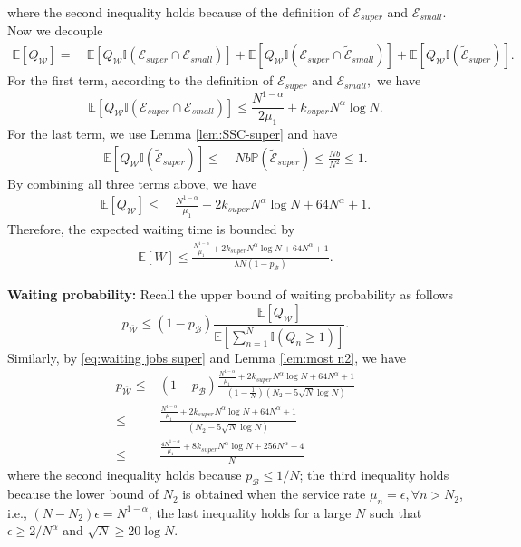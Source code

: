 \documentclass[11pt,oneside,letter]{article}
\begin{document}
where the second inequality holds because of the definition of $\mathcal E_{super}$ and $\mathcal E_{small}$. 
Now we decouple  
\begin{align*}
\mathbb E\left[Q_{\mathcal W}\right] =&~ 
\mathbb E\left[Q_{\mathcal W}\mathbb I(\mathcal E_{super} \cap \mathcal E_{small})\right] + \mathbb E\left[Q_{\mathcal W}\mathbb I(\mathcal E_{super} \cap \tilde{\mathcal E}_{small})\right] + \mathbb E\left[Q_{\mathcal W}\mathbb I(\tilde{\mathcal E}_{super})\right].
\end{align*}
For the first term, according to the definition of $\mathcal E_{super}$ and $\mathcal E_{small},$ we have 
$$\mathbb E\left[Q_{\mathcal W}\mathbb I(\mathcal E_{super} \cap \mathcal E_{small})\right] \leq \frac{N^{1-\alpha}}{2\mu_1}  + k_{super} N^\alpha\log N.$$
For the last term, we use Lemma \ref{lem:SSC-super} and have 
\begin{align*}
\mathbb E\left[Q_{\mathcal W}\mathbb I(\tilde{\mathcal E}_{super})\right] 
\leq&~ Nb \mathbb P\left(\tilde{\mathcal E}_{super}\right) \leq \frac{Nb}{N^{2}} \leq 1. 
\end{align*}
By combining all three terms above, we have
\begin{align}
\mathbb E\left[Q_{\mathcal W}\right] \leq &~ \frac{N^{1-\alpha}}{\mu_1}   + 2 k_{super} N^\alpha\log N + 64N^\alpha + 1. \label{eq:waiting jobs super} 
\end{align}
Therefore, the expected waiting time is bounded by
\begin{align*}
\mathbb E[W] \leq \frac{\frac{N^{1-\alpha}}{\mu_1}   + 2 k_{super} N^\alpha\log N + 64N^\alpha + 1}{\lambda N(1-p_{\mathcal B})}. 
\end{align*}

\vspace{3 pt}
{\bf Waiting probability:}
Recall the upper bound of waiting probability as follows
$$p_{\overline{\mathcal W}} \leq (1-p_{\mathcal B}) \frac{\mathbb E\left[Q_{\mathcal W}\right]}{\mathbb E[\sum_{n=1}^N \mathbb I(Q_n \geq 1)]}.$$ 
Similarly, by \eqref{eq:waiting jobs super} and Lemma \ref{lem:most n2}, we have 
\begin{align*}
p_{\overline{\mathcal W}} \leq& (1-p_{\mathcal B})\frac{\frac{N^{1-\alpha}}{\mu_1} + 2k_{super}N^\alpha\log N + 64N^\alpha + 1}{(1-\frac{1}{N})(N_2 - 5\sqrt{N}\log N)} \\
\leq& \frac{\frac{N^{1-\alpha}}{\mu_1} + 2k_{super}N^\alpha\log N + 64N^\alpha + 1}{(N_2 - 5\sqrt{N}\log N)} \\
\leq& \frac{\frac{4N^{1-\alpha}}{\mu_1} + 8k_{super}N^\alpha\log N + 256N^\alpha + 4}{N} 
\end{align*}
where the second inequality holds because $p_{\mathcal B} \leq 1/N$; the third inequality holds because the lower bound of $N_2$ is obtained when the service rate $\mu_n = \epsilon, \forall n > N_2$, i.e., $(N-N_2)\epsilon = N^{1-\alpha}$; the last inequality holds for a large $N$ such that $\epsilon \geq 2/N^\alpha$ and $\sqrt{N} \geq 20\log N$. 
\end{document}
